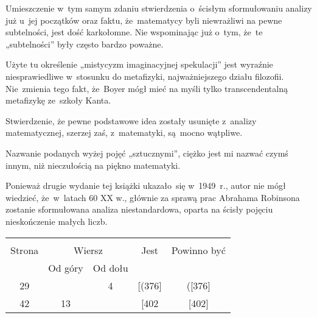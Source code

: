 \documentclass[a4paper,11pt]{article}
\begin{document}
\vspace{\spaceThree}






\vspace{\spaceFour}


\start {} Umieszczenie w~tym samym zdaniu stwierdzenia
o~ścisłym sformułowaniu analizy już u~jej początków oraz faktu,
że~matematycy byli niewrażliwi na pewne subtelności, jest dość
karkołomne. Nie wspominając już o~tym, że~te „subtelności” były
często bardzo poważne.

\vspace{\spaceFour}


\start {} Użyte tu określenie „mistycyzm imaginacyjnej
spekulacji” jest wyraźnie niesprawiedliwe w~stosunku do metafizyki,
najważniejszego działu filozofii. Nie~zmienia tego fakt, że~Boyer mógł
mieć na myśli tylko transcendentalną metafizykę ze~szkoły Kanta.

\vspace{\spaceFour}


\start {} Stwierdzenie, że pewne podstawowe idea zostały
usunięte z~analizy matematycznej, szerzej zaś, z~matematyki, są~mocno
wątpliwe.

\vspace{\spaceFour}


\start {} Nazwanie podanych wyżej pojęć „sztucznymi”,
ciężko jest mi nazwać czymś innym, niż nieczułością na piękno
matematyki.

\vspace{\spaceFour}


\start {} Ponieważ drugie wydanie tej książki ukazało~się w~1949~r., autor nie mógł wiedzieć, że~w~latach 60 XX w., głównie za sprawą
prac Abrahama Robinsona zostanie sformułowana analiza niestandardowa,
oparta na ścisły pojęciu nieskończenie małych liczb.


\begin{center}

  \begin{tabular}{|c|c|c|c|c|}
    \hline
    & \multicolumn{2}{c|}{} & & \\
    Strona & \multicolumn{2}{c|}{Wiersz} & Jest
                              & Powinno być \\ \cline{2-3}
    & Od góry & Od dołu & & \\
    \hline
    29 & & 4 & [(376] & ([376] \\
    42 & 13 & & [402 & [402] \\
    \hline
  \end{tabular}

\end{center}
\end{document}
